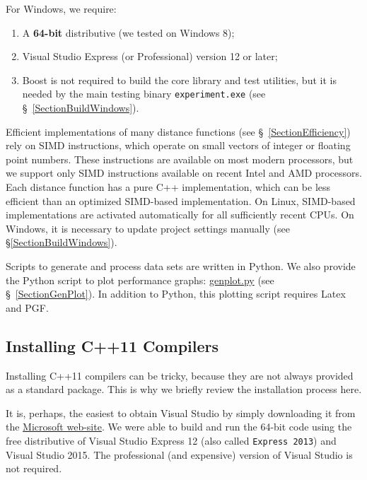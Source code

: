 \documentclass[runningheads,a4paper]{llncs}
\newcommand{\replocfile}{https://github.com/searchivarius/NonMetricSpaceLib/blob/develop/}
\newcommand{\ttt}[1]{\texttt{#1}}
\begin{document}
{For Windows, we require:
\begin{enumerate}
\item A \textbf{64-bit} distributive (we tested on Windows 8); 
\item Visual Studio Express (or Professional) version 12 or later;
\item Boost is not required to build the core library and test utilities, 
but it is needed by the main testing binary \ttt{experiment.exe} (see \S~\ref{SectionBuildWindows}). 
\end{enumerate}

Efficient implementations of many distance functions (see \S~\ref{SectionEfficiency})
rely on SIMD instructions,
which operate on small  vectors of integer or floating point numbers. 
These instructions are available on most modern processors,
but we support only SIMD instructions available on recent Intel and AMD processors.   
Each distance function has a pure C++ implementation,
which can be less efficient than an optimized SIMD-based implementation.
On Linux, SIMD-based implementations are activated automatically 
for all sufficiently recent CPUs. On Windows, it is necessary to update
project settings manually (see \S\ref{SectionBuildWindows}).

Scripts to generate and process data sets are written in Python.
We also provide the Python script to plot performance graphs: \href{\replocfile sample_scripts/sample_scripts/genplot.py}{genplot.py} (see \S~\ref{SectionGenPlot}).
In addition to Python, this plotting script requires Latex and PGF. 

\subsection{Installing C++11 Compilers}
Installing C++11 compilers can be tricky, 
because they are not always provided as a standard package.
This is why we briefly review the installation process here. 

It is, perhaps, the easiest to obtain Visual Studio by simply downloading
it from the \href{https://www.microsoft.com/en-us/download/default.aspx}{Microsoft web-site}.
We were able to build and run the 64-bit code using the free distributive of Visual Studio Express 12 (also called 
\ttt{Express 2013}) and Visual Studio 2015. The professional (and expensive) version of Visual Studio is not required. 


}
\end{document}

